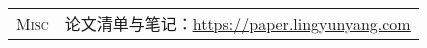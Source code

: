 \documentclass[letterpaper, 10pt]{article}
\begin{document}
\begin{longtable}{p{0.7in}p{6.0in}}

\nohyphens{\textsc{Misc}}
& 论文清单与笔记：\href{https://paper.lingyunyang.com}{\underline{https://paper.lingyunyang.com}} \\


\end{longtable}
\end{document}
